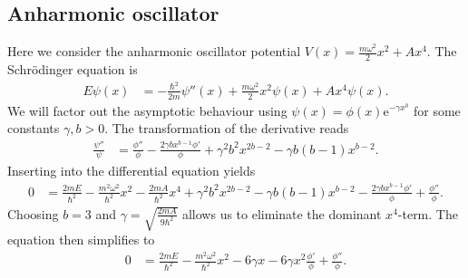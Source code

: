 \documentclass[english, parskip=full]{scrartcl}
\newcommand{\kla}{}
\newcommand{\e}{\text{e}}
\begin{document}
\subsection{Anharmonic oscillator}
Here we consider the anharmonic oscillator potential $V(x) = \frac{m\omega^2}{2}x^2 + Ax^4$.
The Schrödinger equation is
\begin{align}
E\psi(x) &= -\frac{\hbar^2}{2m}\psi''(x) + \frac{m\omega^2}{2}x^2\psi(x) + Ax^4\psi(x).
\end{align}
We will factor out the asymptotic behaviour using $\psi(x) = \phi(x) \e^{-\gamma x^b}$ for some constants $\gamma,b>0$.
The transformation of the derivative reads
\begin{align}
\frac{\psi''}{\psi} &= \frac{\phi''}{\phi} - \frac{2\gamma bx^{b-1}\phi'}{\phi} + \gamma^2b^2x^{2b-2} - \gamma b(b-1)x^{b-2}.
\end{align}
Inserting into the differential equation yields
\begin{align}
0 &= \frac{2mE}{\hbar^2} - \frac{m^2\omega^2}{\hbar^2}x^2 - \frac{2mA}{\hbar^2}x^4 + \gamma^2b^2x^{2b-2} - \gamma b(b-1)x^{b-2} - \frac{2\gamma bx^{b-1}\phi'}{\phi} + \frac{\phi''}{\phi}.
\end{align}
Choosing $b=3$ and $\gamma = \sqrt{\frac{2mA}{9\hbar^2}}$ allows us to eliminate the dominant $x^4$-term.
The equation then simplifies to
\begin{align}
0 &= \frac{2mE}{\hbar^2} - \frac{m^2\omega^2}{\hbar^2}x^2 - 6\gamma x - 6\gamma x^2\frac{\phi'}{\phi} + \frac{\phi''}{\phi}.
\end{align}
\end{document}
